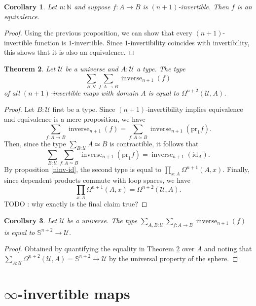 \documentclass{article}
\theoremstyle{plain}
\newtheorem{theorem}{Theorem}
\newtheorem{corollary}[theorem]{Corollary}
\theoremstyle{definition}
\theoremstyle{remark}
\newcommand{\id}{\mathrm{id}}
\newcommand{\pr}{\mathrm{pr}}
\newcommand{\nsphere}[1]{\mathbb{S}^{#1}}
\newcommand{\U}{\mathcal{U}}
\newcommand{\N}{\mathbb{N}}
\newcommand{\lspace}[1]{\Omega^{#1}}
\DeclareMathOperator{\inverse}{inverse}
\newcommand{\ninverse}[1]{\inverse_{#1}}
\begin{document}
\begin{corollary}
  Let \(n : \N\) and suppose \(f : A \to B\) is \((n + 1)\)-invertible. Then \(f\) is an
  equivalence.
\end{corollary}

\begin{proof}
  Using the previous proposition, we can show that every \((n + 1)\)-invertible function is
  \(1\)-invertible. Since \(1\)-invertibility coincides with invertibility, this shows that
  it is also an equivalence.
\end{proof}

\begin{theorem}
  \label{ninv-maps-with-domain}
  Let \(\U\) be a universe and \(A : \U\) a type. The type
  \[\sum_{B : \U}\sum_{f : A \to B}\inverse_{n + 1}(f)\] of all \((n + 1)\)-invertible maps
  with domain \(A\) is equal to
  \(\lspace{n + 2}(\U, A)\).
\end{theorem}

\begin{proof}
  Let \(B : \U\) first be a type. Since \((n + 1)\)-invertibility implies equivalence and
  equivalence is a mere proposition, we have
  \[\sum_{f : A \to B}\ninverse{n + 1}(f) = \sum_{f : A \simeq B}\ninverse{n + 1}(\pr_{1}f).\]
  Then, since the type \(\sum_{B : \U}{A \simeq B}\) is contractible, it follows that
  \[\sum_{B : \U}\sum_{f : A \simeq B}\ninverse{n + 1}(\pr_{1}f) =
    \ninverse{n + 1}{(\id_{A})}.\]
  By proposition \ref{ninv-id}, the second type is equal to
  \(\prod_{x : A}\lspace{n + 1}(A, x)\). Finally, since dependent products commute with loop
  spaces, we have
  \[\prod_{x : A}\lspace{n + 1}(A, x) = \lspace{n + 2}(\U, A).\]
  TODO : why exactly is the final claim true?
\end{proof}

\begin{corollary}
  Let \(\U\) be a universe. The type
  \(\sum_{A, B : \U}\sum_{f : A \to B}\ninverse{n + 1}(f)\) is equal to
  \(\nsphere{n + 2} \to \U\).
\end{corollary}

\begin{proof}
  Obtained by quantifying the equality in Theorem \ref{ninv-maps-with-domain} over \(A\)
  and noting
  that \(\sum_{A : \U}\lspace{n + 2}(\U, A) = \nsphere{n + 2} \to \U\) by the universal
  property of the sphere.
\end{proof}

\section{\(\infty\)-invertible maps}
\end{document}

